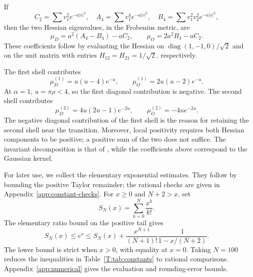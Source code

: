 \documentclass[reqno,english]{amsart}
\theoremstyle{definition}
\newtheorem{open problem}[theorem]{Open Problem}
\theoremstyle{remark}
\theoremstyle{plain}
\numberwithin{equation}{section}
\newcommand{\diag}{\operatorname{diag}}
\begin{document}
If
\[
 C_2=\sum v_1^2e^{-a|v|^2},\quad
 A_4=\sum v_1^4e^{-a|v|^2},\quad
 B_4=\sum v_1^2v_2^2e^{-a|v|^2},
\]
then the two Hessian eigenvalues, in the Frobenius metric, are
\begin{equation}\label{T:eq:blocks}
 \mu_D=a^2(A_4-B_4)-aC_2,\qquad
 \mu_O=2a^2B_4-aC_2.
\end{equation}
These coefficients follow by evaluating the Hessian on
$\diag(1,-1,0)/\sqrt2$ and on the unit matrix with entries
$H_{12}=H_{21}=1/\sqrt2$, respectively.

The first shell contributes
\begin{equation}\label{T:eq:hessfirst}
 \mu_D^{(1)}=u(u-4)e^{-u},\qquad
 \mu_O^{(1)}=2u(u-2)e^{-u}.
\end{equation}
At $\alpha=1$, $u=\pi\rho<4$, so the first diagonal contribution is negative. The second shell contributes
\begin{equation}\label{T:eq:hesssecond}
 \mu_D^{(2)}=4u(2u-1)e^{-2u},\qquad
 \mu_O^{(2)}=-4ue^{-2u}.
\end{equation}
The negative diagonal contribution of the first shell is the reason
for retaining the second shell near the transition. Moreover, local
positivity requires both Hessian components to be positive; a positive
sum of the two does not suffice. The invariant decomposition is that of
\cite[Section~3, (21)]{SS}, while the coefficients above correspond
to the Gaussian kernel.


For later use, we collect the elementary exponential estimates. They
follow by bounding the positive Taylor remainder; the rational checks
are given in Appendix~\ref{app:constant-checks}. For $x\ge0$ and
$N+2>x$, set
\[
 S_N(x)=\sum_{k=0}^N\frac{x^k}{k!}.
\]
The elementary ratio bound on the positive tail gives
\begin{equation}\label{T:eq:exp-rational}
 S_N(x)\le e^x\le S_N(x)+
 \frac{x^{N+1}}{(N+1)!}\frac1{1-x/(N+2)}.
\end{equation}
The lower bound is strict when $x>0$, with equality at $x=0$.
Taking $N=100$ reduces the inequalities in
Table~\ref{T:tab:constants} to rational comparisons.
Appendix~\ref{app:numerical} gives the evaluation and rounding-error
bounds.
\end{document}
